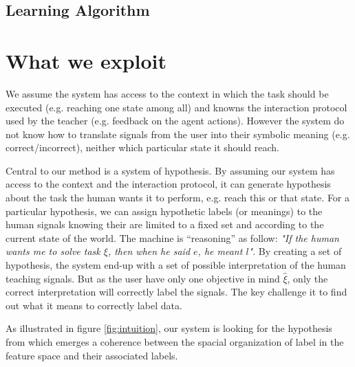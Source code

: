 \subsection{Learning Algorithm}

\section{What we exploit}

We assume the system has access to the context in which the task should be executed (e.g. reaching one state among all) and knowns the interaction protocol used by the teacher (e.g. feedback on the agent actions). However the system do not know how to translate signals from the user into their symbolic meaning (e.g. correct/incorrect), neither which particular state it should reach.

Central to our method is a system of hypothesis. By assuming our system has access to the context and the interaction protocol, it can generate hypothesis about the task the human wants it to perform, e.g. reach this or that state. For a particular hypothesis, we can assign hypothetic labels (or meanings) to the human signals knowing their are limited to a fixed set and according to the current state of the world. The machine is ``reasoning'' as follow: \emph{"If the human wants me to solve task $\xi$, then when he said $e$, he meant $l$"}. By creating a set of hypothesis, the system end-up with a set of possible interpretation of the human teaching signals. But as the user have only one objective in mind $\hat{\xi}$, only the correct interpretation will correctly label the signals. 
The key challenge it to find out what it means to correctly label data.

As illustrated in figure \ref{fig:intuition}, our system is looking for the hypothesis from which emerges a coherence between the spacial organization of label in the feature space and their associated labels.


